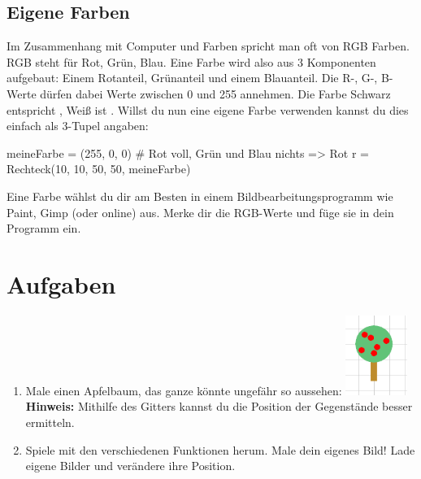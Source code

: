 \documentclass{\VorlagenPfad/coderdojokatext}
\begin{document}
\subsection{Eigene Farben}
Im Zusammenhang mit Computer und Farben spricht man oft von RGB Farben. RGB steht für Rot, Grün, Blau. Eine Farbe wird also aus 3 Komponenten aufgebaut: Einem Rotanteil, Grünanteil und einem Blauanteil. Die R-, G-, B-Werte dürfen dabei Werte zwischen 0 und 255 annehmen. Die Farbe Schwarz entspricht , Weiß ist . 
Willst du nun eine eigene Farbe verwenden kannst du dies einfach als 3-Tupel angaben:

\begin{pythoncode}
meineFarbe = (255, 0, 0) # Rot voll, Grün und Blau nichts => Rot
r = Rechteck(10, 10, 50, 50, meineFarbe)
\end{pythoncode}
Eine Farbe wählst du dir am Besten in einem Bildbearbeitungsprogramm wie Paint, Gimp (oder online) aus. Merke dir die RGB-Werte und füge sie in dein Programm ein.
\section{Aufgaben}
\begin{enumerate}
\item Male einen Apfelbaum, das ganze könnte ungefähr so aussehen:
\includegraphics[width=20mm]{baum.png}	
\\
\textbf{Hinweis:} Mithilfe des Gitters kannst du die Position der Gegenstände besser ermitteln.

\item Spiele mit den verschiedenen Funktionen herum. Male dein eigenes Bild! Lade eigene Bilder und verändere ihre Position.
\end{enumerate}
\end{document}
